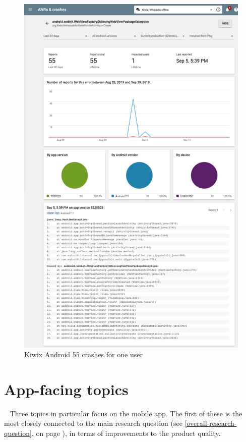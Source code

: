 \begin{figure}
    \centering
    \includegraphics[width=0.9\linewidth]{images/android-vitals-screenshots/kiwix/55-crashes-WebViewFactory-MissingWebViewPackageException_2019-09-19-kiwix_trimmed.pdf}
    \caption{Kiwix Android 55 crashes for one user}
    \label{fig:55-crashes-WebViewFactory-MissingWebViewPackageException}
\end{figure}

\FloatBarrier
\section{App-facing topics}~\label{aata-app-facing-topics}
Three topics in particular focus on the mobile app. The first of these is the most closely connected to the main research question (see \ref{overall-research-question}, on page \pageref{overall-research-question}), in terms of improvements to the product quality. 


